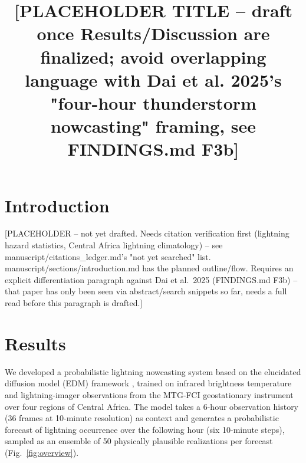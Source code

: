 \documentclass[pdflatex,sn-nature]{sn-jnl}%
\begin{document}
\title[Probabilistic lightning nowcasting over Central Africa]{%
[PLACEHOLDER TITLE -- draft once Results/Discussion are finalized;
avoid overlapping language with Dai et al. 2025's "four-hour
thunderstorm nowcasting" framing, see FINDINGS.md F3b]}

\author*[1]{\fnm{[First]} \sur{[Author]}}\email{[email]}



\maketitle

\section{Introduction}\label{sec:intro}

[PLACEHOLDER -- not yet drafted. Needs citation verification first
(lightning hazard statistics, Central Africa lightning climatology) --
see manuscript/citations\_ledger.md's "not yet searched" list.
manuscript/sections/introduction.md has the planned outline/flow.
Requires an explicit differentiation paragraph against Dai et al.\
2025 (FINDINGS.md F3b) -- that paper has only been seen via
abstract/search snippets so far, needs a full read before this
paragraph is drafted.]

\section{Results}\label{sec:results}

We developed a probabilistic lightning nowcasting system based on the
elucidated diffusion model (EDM) framework \citep{karras2022edm},
trained on infrared brightness temperature and lightning-imager
observations from the MTG-FCI geostationary instrument over four
regions of Central Africa. The model takes a 6-hour observation history
(36 frames at 10-minute resolution) as context and generates a
probabilistic forecast of lightning occurrence over the following hour
(six 10-minute steps), sampled as an ensemble of 50 physically
plausible realizations per forecast (Fig.~\ref{fig:overview}).
\end{document}
